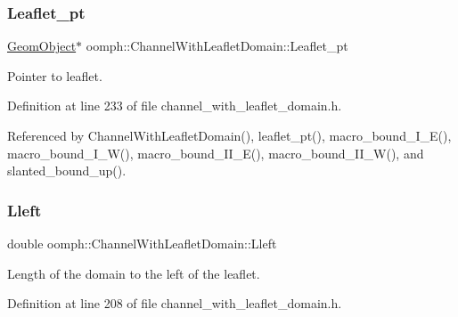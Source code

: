 \mbox{\label{classoomph_1_1ChannelWithLeafletDomain_a08a8eb7078cdc788dc7643e09e7405fb}} 
\subsubsection{\texorpdfstring{Leaflet\+\_\+pt}{Leaflet\_pt}}
{\footnotesize\ttfamily \hyperlink{classoomph_1_1GeomObject}{Geom\+Object}$\ast$ oomph\+::\+Channel\+With\+Leaflet\+Domain\+::\+Leaflet\+\_\+pt\hspace{0.3cm}{\ttfamily [protected]}}



Pointer to leaflet. 



Definition at line 233 of file channel\+\_\+with\+\_\+leaflet\+\_\+domain.\+h.



Referenced by Channel\+With\+Leaflet\+Domain(), leaflet\+\_\+pt(), macro\+\_\+bound\+\_\+\+I\+\_\+\+E(), macro\+\_\+bound\+\_\+\+I\+\_\+\+W(), macro\+\_\+bound\+\_\+\+I\+I\+\_\+\+E(), macro\+\_\+bound\+\_\+\+I\+I\+\_\+\+W(), and slanted\+\_\+bound\+\_\+up().

\mbox{\label{classoomph_1_1ChannelWithLeafletDomain_a0a50a8a7b274fb1dfc6d18c79ca884cd}} 
\subsubsection{\texorpdfstring{Lleft}{Lleft}}
{\footnotesize\ttfamily double oomph\+::\+Channel\+With\+Leaflet\+Domain\+::\+Lleft\hspace{0.3cm}{\ttfamily [protected]}}



Length of the domain to the left of the leaflet. 



Definition at line 208 of file channel\+\_\+with\+\_\+leaflet\+\_\+domain.\+h.



